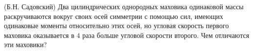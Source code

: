 (Б.Н. Садовский)
Два цилиндрических однородных маховика одинаковой массы раскручиваются
вокруг своих осей симметрии с помощью сил, имеющих одинаковые моменты
относительно этих осей, но угловая скорость первого маховика оказывается
в $4$ раза больше угловой скорости второго. Чем отличаются эти маховики?
